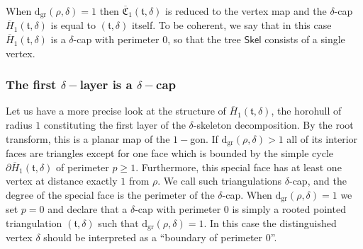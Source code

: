 \documentclass[AHL,XML,longabstracts,Unicode,NoSaveZebib]{cedram}
\begin{document}
\begin{center}
\end{center}

\begin{remark} When $ \mathrm{d_{gr}}(\rho,\delta)=1$ then $\overline{ \mathfrak{C}}_{1}( \mathfrak{t},\delta)$ is reduced to the vertex map and the $\delta$-cap $\overline{H}_{1}( \mathfrak{t}, \delta)$ is equal to $( \mathfrak{t},\delta)$ itself. To be coherent, we say that in this case $\overline{H}_{1}( \mathfrak{t}, \delta)$ is a $\delta$-cap with perimeter $0$, so that the tree $ \mathsf{Skel}$ consists of a single vertex.
\end{remark}

\subsubsection{The first \texorpdfstring{$\delta-$}{delta-}layer is a \texorpdfstring{$\delta-$}{delta-}cap}
\label{sec:caps}

Let us have a more precise look at the structure of $\overline{{H}}_1 ( \mathfrak{t}, \delta)$, the horohull of radius $1$ constituting the first layer of the $\delta$-skeleton decomposition. By the root transform, this is a planar map of the $1-$gon.  If $ \mathrm{d_{gr}}(\rho,\delta) > 1$ all of its interior faces are triangles except for one face which is bounded by the simple cycle $\partial \overline{H}_{1}( \mathfrak{t},\delta)$ of perimeter $p \geq 1$. Furthermore, this special face has at least one vertex at distance exactly $1$ from $\rho$. We call such triangulations $\delta$-cap, and the degree of the special face is the perimeter of the $\delta$-cap. When $\mathrm{d_{gr}}(\rho,\delta) = 1$ we set $p=0$ and declare that a $\delta$-cap with perimeter $0$ is simply a rooted pointed triangulation $( \mathfrak{t}, \delta)$ such that $ \mathrm{d_{gr}}(\rho,\delta)=1$. In this case the distinguished vertex $\delta$ should be interpreted as a ``boundary of perimeter $0$''. \medskip
\end{document}
